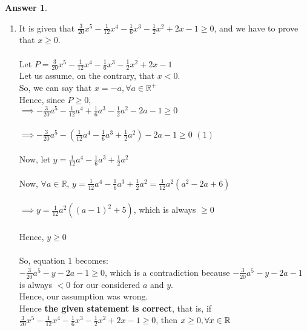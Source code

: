 \documentclass[a4paper]{article}
\theoremstyle{definition}
\newtheorem{answer}{Answer}
\begin{document}
\vspace*{2em}
\begin{answer}\
    \begin{enumerate}
        \item It is given that $\frac{3}{20}x^5 - \frac{1}{12}x^4 - \frac{1}{6}x^3 - \frac{1}{2}x^2
            + 2x - 1 \geq 0$, and we have to prove that $x \geq 0$.\\\\
            Let $P = \frac{3}{20}x^5 - \frac{1}{12}x^4 - \frac{1}{6}x^3 - \frac{1}{2}x^2
            + 2x - 1$\\
            Let us assume, on the contrary, that $x < 0$.\\
            So, we can say that $x = -a, \forall a \in \mathbb{R}^+$\\
            Hence, since $P \geq 0$,\\
            $\implies - \frac{3}{20}a^5 - \frac{1}{12}a^4 + \frac{1}{6}a^3 - \frac{1}{2}a^2
            - 2a - 1 \geq 0$\\\\
            $\implies - \frac{3}{20}a^5 - \left( \frac{1}{12}a^4 - \frac{1}{6}a^3 + \frac{1}{2}a^2 \right)- 2a - 1 \geq 0$ \space\space\space\space$(1)$\\\\
            Now, let $y = \frac{1}{12}a^4 - \frac{1}{6}a^3 + \frac{1}{2}a^2$\\\\
            Now, $\forall a \in \mathbb{R}$, $y = \frac{1}{12}a^4 - \frac{1}{6}a^3 + \frac{1}{2}a^2 = \frac{1}{12}a^2 \left(a^2 - 2a + 6\right)$\\\\
            $\implies y = \frac{1}{12}a^2 \left(\left(a - 1\right)^2 + 5\right)$, which is always $\geq 0$\\\\
            Hence, $y \geq 0$\\\\
            So, equation $1$ becomes:\\
            $- \frac{3}{20}a^5 - y - 2a - 1 \geq 0$, which is a contradiction because $- \frac{3}{20}a^5 - y - 2a - 1$ is always $< 0$ for our considered $a$ and $y$.\\
            Hence, our assumption was wrong.\\
            Hence \textbf{the given statement is correct}, that is, if $\frac{3}{20}x^5 - \frac{1}{12}x^4 - \frac{1}{6}x^3 - \frac{1}{2}x^2
            + 2x - 1 \geq 0$, then $x \geq 0 ,\space \forall x \in \mathbb{R}$

\end{enumerate}
\end{answer}
\end{document}
